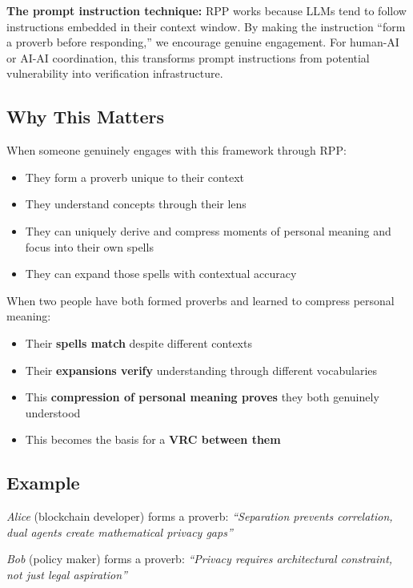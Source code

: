 \documentclass[
]{article}
\begin{document}
\textbf{The prompt instruction technique:} RPP works because LLMs tend
to follow instructions embedded in their context window. By making the
instruction ``form a proverb before responding,'' we encourage genuine
engagement. For human-AI or AI-AI coordination, this transforms prompt
instructions from potential vulnerability into verification
infrastructure.

\subsection{Why This Matters}\label{why-this-matters-1}

When someone genuinely engages with this framework through RPP:

\begin{itemize}
\item
  They form a proverb unique to their context
\item
  They understand concepts through their lens
\item
  They can uniquely derive and compress moments of personal meaning and
  focus into their own spells
\item
  They can expand those spells with contextual accuracy
\end{itemize}

When two people have both formed proverbs and learned to compress
personal meaning:

\begin{itemize}
\item
  Their \textbf{spells match} despite different contexts
\item
  Their \textbf{expansions verify} understanding through different
  vocabularies
\item
  This \textbf{compression of personal meaning proves} they both
  genuinely understood
\item
  This becomes the basis for a \textbf{VRC between them}
\end{itemize}

\subsection{Example}\label{example}

\emph{Alice} (blockchain developer) forms a proverb: \emph{``Separation
prevents correlation, dual agents create mathematical privacy gaps''}

\emph{Bob} (policy maker) forms a proverb: \emph{``Privacy requires
architectural constraint, not just legal aspiration''}
\end{document}
